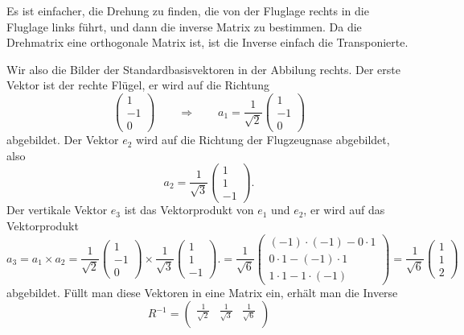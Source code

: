 \begin{loesung}
\begin{teilaufgaben}
\item
Es ist einfacher, die Drehung zu finden, die von der Fluglage rechts
in die Fluglage links führt, und dann die inverse Matrix zu bestimmen.
Da die Drehmatrix eine orthogonale Matrix ist, ist die Inverse einfach
die Transponierte.

Wir also die Bilder der Standardbasisvektoren in der Abbilung rechts.
Der erste Vektor ist der rechte Flügel, er wird auf die Richtung
\[
\begin{pmatrix} 1\\-1\\0 \end{pmatrix}
\qquad\Rightarrow\qquad
a_1
=
\frac{1}{\sqrt{2}}
\begin{pmatrix} 1\\-1\\0 \end{pmatrix}
\]
abgebildet.
Der Vektor $e_2$ wird auf die Richtung der Flugzeugnase abgebildet,
also
\[
a_2
=
\frac{1}{\sqrt{3}}
\begin{pmatrix} 1\\1\\-1 \end{pmatrix}.
\]
Der vertikale Vektor $e_3$ ist das Vektorprodukt von $e_1$ und $e_2$,
er wird auf das Vektorprodukt
\[
a_3
=
a_1\times a_2
=
\frac{1}{\sqrt{2}}
\begin{pmatrix} 1\\-1\\0 \end{pmatrix}
\times
\frac{1}{\sqrt{3}}
\begin{pmatrix} 1\\1\\-1 \end{pmatrix}.
=
\frac{1}{\sqrt{6}}
\begin{pmatrix}
(-1)\cdot(-1)-0\cdot 1\\
0\cdot 1 - (-1)\cdot 1\\
1\cdot 1 - 1\cdot(-1)
\end{pmatrix}
=
\frac{1}{\sqrt{6}}
\begin{pmatrix}
1\\
1\\
2
\end{pmatrix}
\]
abgebildet.
Füllt man diese Vektoren in eine Matrix ein, erhält man die Inverse
\[
R^{-1}
=
\begin{pmatrix}
 \frac{1}{\sqrt{2}}& \frac{1}{\sqrt{3}}&\frac{1}{\sqrt{6}}\\

\end{pmatrix}\]
\end{teilaufgaben}
\end{loesung}
